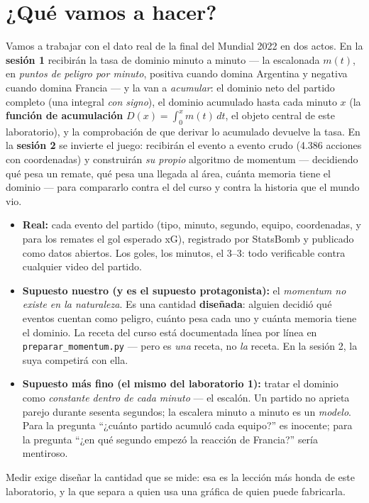\documentclass[12pt,letterpaper]{article}
\begin{document}
\section{¿Qué vamos a hacer?}
Vamos a trabajar con el dato real de la final del Mundial 2022 en dos actos. En la \textbf{sesión 1} recibirán la tasa de dominio minuto a minuto --- la escalonada $m(t)$, en \emph{puntos de peligro por minuto}, positiva cuando domina Argentina y negativa cuando domina Francia --- y la van a \emph{acumular}: el dominio neto del partido completo (una integral \emph{con signo}), el dominio acumulado hasta cada minuto $x$ (la \textbf{función de acumulación} $D(x)=\int_0^x m(t)\,dt$, el objeto central de este laboratorio), y la comprobación de que derivar lo acumulado devuelve la tasa. En la \textbf{sesión 2} se invierte el juego: recibirán el evento a evento crudo (4.386 acciones con coordenadas) y construirán \emph{su propio} algoritmo de momentum --- decidiendo qué pesa un remate, qué pesa una llegada al área, cuánta memoria tiene el dominio --- para compararlo contra el del curso y contra la historia que el mundo vio.

\begin{cajareal}
\begin{itemize}[itemsep=0.1em]
    \item \textbf{Real:} cada evento del partido (tipo, minuto, segundo, equipo, coordenadas, y para los remates el gol esperado xG), registrado por StatsBomb y publicado como datos abiertos. Los goles, los minutos, el 3--3: todo verificable contra cualquier video del partido.
    \item \textbf{Supuesto nuestro (y es el supuesto protagonista):} el \emph{momentum no existe en la naturaleza}. Es una cantidad \textbf{diseñada}: alguien decidió qué eventos cuentan como peligro, cuánto pesa cada uno y cuánta memoria tiene el dominio. La receta del curso está documentada línea por línea en \texttt{preparar\_momentum.py} --- pero es \emph{una} receta, no \emph{la} receta. En la sesión 2, la suya competirá con ella.
    \item \textbf{Supuesto más fino (el mismo del laboratorio 1):} tratar el dominio como \emph{constante dentro de cada minuto} --- el escalón. Un partido no aprieta parejo durante sesenta segundos; la escalera minuto a minuto es un \emph{modelo}. Para la pregunta ``¿cuánto partido acumuló cada equipo?'' es inocente; para la pregunta ``¿en qué segundo empezó la reacción de Francia?'' sería mentiroso.
\end{itemize}
Medir exige diseñar la cantidad que se mide: esa es la lección más honda de este laboratorio, y la que separa a quien usa una gráfica de quien puede fabricarla.
\end{cajareal}
\end{document}
